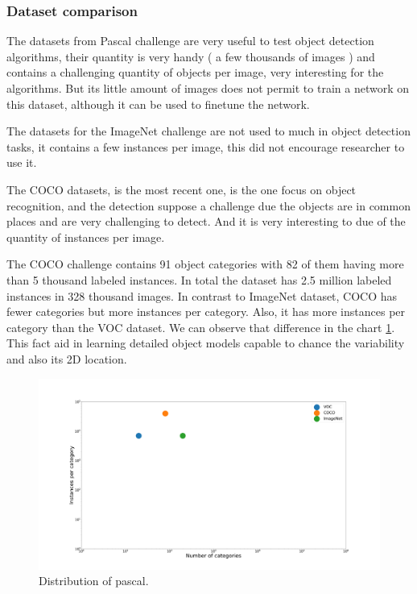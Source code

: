\documentclass[12pt, a4paper, titlepage,twoside,openright]{article}
\begin{document}
\subsubsection{Dataset comparison}


The datasets from Pascal challenge are very useful to test object detection algorithms, their quantity is very handy ( a few thousands of images ) and contains a challenging quantity of objects per image, very interesting for the algorithms. But its little amount of images does not permit to train a network on this dataset, although it can be used to finetune the network.

The datasets for the ImageNet challenge are not used to much in object detection tasks, it contains a few instances per image, this did not encourage researcher to use it.


The COCO datasets, is the most recent one, is the one focus on object recognition, and the detection suppose a challenge due the objects are in common places and are very challenging to detect. And it is very interesting to due of the quantity of instances per image.


The COCO challenge contains 91 object categories with 82 of them having more than 5 thousand labeled instances. In total the dataset has 2.5 million labeled instances in 328 thousand images. In contrast to ImageNet dataset, COCO has fewer categories but more instances per category. Also, it has more instances per category than the VOC dataset. We can observe that difference in the chart \ref{instancesCategory}. This fact aid in learning detailed object models capable to chance the variability and also its 2D location.

\begin{figure}[H]
\centering         
\includegraphics[width=0.7\linewidth]{datasets/sdad2.png}
\caption{Distribution of pascal.} \label{instancesCategory}
\end{figure}
\end{document}
